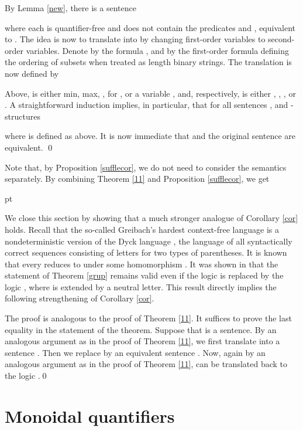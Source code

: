 \documentclass{LMCS}
\begin{document}
By Lemma \ref{new}, there is a sentence

where each  is quantifier-free and does not contain the predicates  and , equivalent to .
The idea is now to translate  into  
by  changing first-order variables to second-order variables. Denote by  the formula
,
and by  the first-order formula defining the ordering of subsets when treated  as length  binary strings. The translation  
is now defined by

Above,   is  either min, max, , for , or a variable , and, respectively,  is  either , , , or . A straightforward  induction implies, in particular, that for all sentences , and -structures 

where   is defined as above. It is now immediate that  and the original  sentence  are equivalent.
\qed

Note that, by Proposition \ref{sufflecor},  we do not need to consider the semantics  separately. By combining 
Theorem \ref{11} and Proposition \ref{sufflecor}, we get
\begin{cor}\label{cor}

\end{cor} pt

\noindent We close this section by showing that a much stronger analogue of Corollary \ref{cor} holds. Recall that the so-called Greibach's hardest context-free language  is a  nondeterministic
version of the Dyck language , the language of all syntactically correct sequences consisting of letters for two types of parentheses. It is known that every  reduces to  under some homomorphism \cite{gre73}. It was shown in \cite{lamcscvo01} that the statement of Theorem \ref{grup} remains valid even if the
logic  is replaced by the logic , where  is  extended by a neutral letter. This result directly implies the following strengthening of Corollary \ref{cor}.

\begin{thm}\label{Greibach}

\end{thm}
\proof The proof is analogous to the proof of Theorem \ref{11}. It suffices to prove the last equality in the statement of the theorem. Suppose that   is a sentence. By an analogous argument as in the proof of Theorem \ref{11}, we first translate
 into a sentence . Then we replace  by an equivalent sentence . Now, again by an analogous argument as in the proof of Theorem \ref{11},  can be translated back to the logic  .\qed

\section{Monoidal quantifiers}
\end{document}
